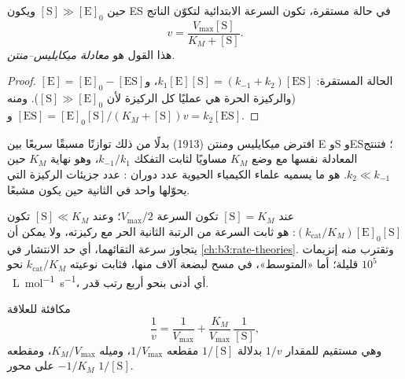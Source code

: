 \begin{theorem}\label{thm:b3:complex-kinetics:michaelis-menten}
حين $[\mathrm S] \gg [\mathrm E]_0$ ويكون ES في حالة مستقرة، تكون السرعة الابتدائية لتكوّن
الناتج
\[
  v = \frac{V_{\max}[\mathrm S]}{K_M + [\mathrm S]} .
\]
هذا القول هو \emph{معادلة ميكايليس--منتن}.
\end{theorem}

\begin{proof}
الحالة المستقرة: $k_1[\mathrm E][\mathrm S] = (k_{-1} + k_2)[\mathrm{ES}]$، و$[\mathrm E] = [\mathrm E]_0 - [\mathrm{ES}]$ (والركيزة
الحرة هي عمليًا كل الركيزة لأن $[\mathrm S] \gg [\mathrm E]_0$). ومنه $[\mathrm{ES}]
= [\mathrm E]_0[\mathrm S]/(K_M + [\mathrm S])$ و$v = k_2[\mathrm{ES}]$.
\end{proof}

\begin{remark}
افترض ميكايليس ومنتن (1913) بدلًا من ذلك توازنًا مسبقًا سريعًا بين E وS 
وES؛ فتنتج المعادلة نفسها مع وضع $K_M$ مساويًا لثابت التفكك
$k_{-1}/k_1$، وهو نهاية $K_M$ حين $k_2 \ll k_{-1}$.  هو ما
يسميه علماء الكيمياء الحيوية عدد دوران : عدد جزيئات الركيزة
التي يحوّلها  واحد في الثانية حين يكون مشبعًا.
\end{remark}

عند $[\mathrm S] = K_M$ تكون السرعة $V_{\max}/2$؛ وعند $[\mathrm S] \ll K_M$ تكون $(k_{\mathrm{cat}}/K_M)[\mathrm E]_0[\mathrm S]$:
 هو ثابت السرعة من الرتبة الثانية  الحر مع
ركيزته، ولا يمكن أن يتجاوز سرعة التقائهما، أي
حد الانتشار في \cref{ch:b3:rate-theories}. وتقترب منه إنزيمات قليلة؛ أما
 «المتوسط»، في مسح لبضعة آلاف منها، فثابت نوعيته $k_{\mathrm{cat}}/K_M$ نحو
$10^5$~\unit{L.mol^{-1}.s^{-1}}، أي أدنى بنحو أربع رتب قدر.

\begin{proposition}\label{prop:b3:complex-kinetics:lineweaver}
 مكافئة للعلاقة
\[
  \frac1v = \frac{1}{V_{\max}} + \frac{K_M}{V_{\max}}\,\frac{1}{[\mathrm S]},
\]
وهي مستقيم للمقدار $1/v$ بدلالة $1/[\mathrm S]$ مقطعه $1/V_{\max}$، وميله $K_M/V_{\max}$، 
ومقطعه $-1/K_M$ على محور $1/[\mathrm S]$.
\end{proposition}

